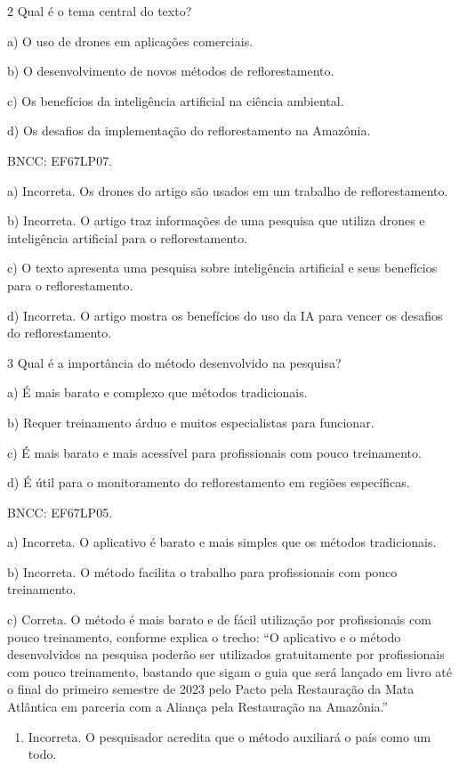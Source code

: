 {\num{2} Qual é o tema central do texto?

a) O uso de drones em aplicações comerciais.

b) O desenvolvimento de novos métodos de reflorestamento.

c) Os benefícios da inteligência artificial na ciência ambiental.

d) Os desafios da implementação do reflorestamento na Amazônia.

BNCC: EF67LP07.

a) Incorreta. Os drones do artigo são usados em um trabalho de
reflorestamento.

b) Incorreta. O artigo traz informações de uma pesquisa que utiliza
drones e inteligência artificial para o reflorestamento.

c) O texto apresenta uma pesquisa sobre inteligência artificial e seus
benefícios para o reflorestamento.

d) Incorreta. O artigo mostra os benefícios do uso da IA para vencer os
desafios do reflorestamento.

\num{3} Qual é a importância do método desenvolvido na pesquisa?

a) É mais barato e complexo que métodos tradicionais.

b) Requer treinamento árduo e muitos especialistas para funcionar.

c) É mais barato e mais acessível para profissionais com pouco
treinamento.

d) É útil para o monitoramento do reflorestamento em regiões
específicas.

BNCC: EF67LP05.

a) Incorreta. O aplicativo é barato e mais simples que os métodos
tradicionais.

b) Incorreta. O método facilita o trabalho para profissionais com pouco
treinamento.

c) Correta. O método é mais barato e de fácil utilização por
profissionais com pouco treinamento, conforme explica o trecho: ``O
aplicativo e o método desenvolvidos na pesquisa poderão ser utilizados
gratuitamente por profissionais com pouco treinamento, bastando que
sigam o guia que será lançado em livro até o final do primeiro semestre
de 2023 pelo Pacto pela Restauração da Mata Atlântica em parceria com a
Aliança pela Restauração na Amazônia.''

\begin{enumerate}
\def\labelenumi{\alph{enumi})}
\setcounter{enumi}{3}
\tightlist
\item
  Incorreta. O pesquisador acredita que o método auxiliará o país como
  um todo.
\end{enumerate}

}
